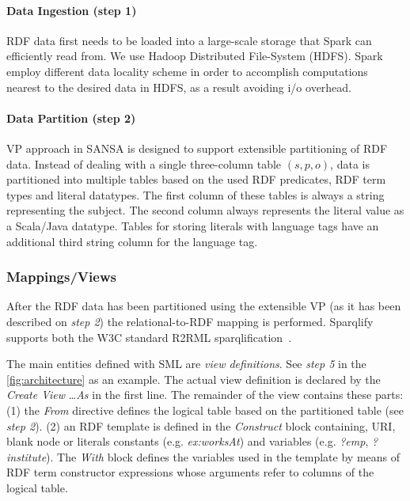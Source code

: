 \paragraph{Data Ingestion (step 1)} RDF data first needs to be loaded into a large-scale storage that Spark can efficiently read from.
We use Hadoop Distributed File-System (HDFS).
Spark employ different data locality scheme in order to accomplish computations nearest to the desired data in HDFS, as a result avoiding i/o overhead. 
\paragraph{Data Partition (step 2)}
VP approach in SANSA is designed to support extensible partitioning of RDF data.
Instead of dealing with a single three-column table $(s, p, o)$, data is partitioned into multiple tables based on the used RDF predicates, RDF term types and literal datatypes.
The first column of these tables is always a string representing the subject.
The second column always represents the literal value as a Scala/Java datatype.
Tables for storing literals with language tags have an additional third string column for the language tag.
\subsubsection{Mappings/Views}
After the RDF data has been partitioned using the extensible VP (as it has been described on \textit{step 2}) the relational-to-RDF mapping is performed. 
Sparqlify supports both the W3C standard R2RML
sparqlification~\cite{sml}.

The main entities defined with SML are \textit{view definitions}.
See \textit{step 5} in the \autoref{fig:architecture} as an example.
The actual view definition is declared by the \emph{Create View} \ldots \emph{As} in the first line.
The remainder of the view contains these parts: (1) the \emph{From} directive defines the logical table based on the partitioned table (see \textit{step 2}).
(2) an RDF template is defined in the \emph{Construct} block containing, URI, blank node or literals constants (e.g. \emph{ex:worksAt}) and variables (e.g. \emph{?emp}, \emph{?institute}).
The \emph{With} block defines the variables used in the template by means of RDF term constructor expressions whose arguments refer to columns of the logical table.

